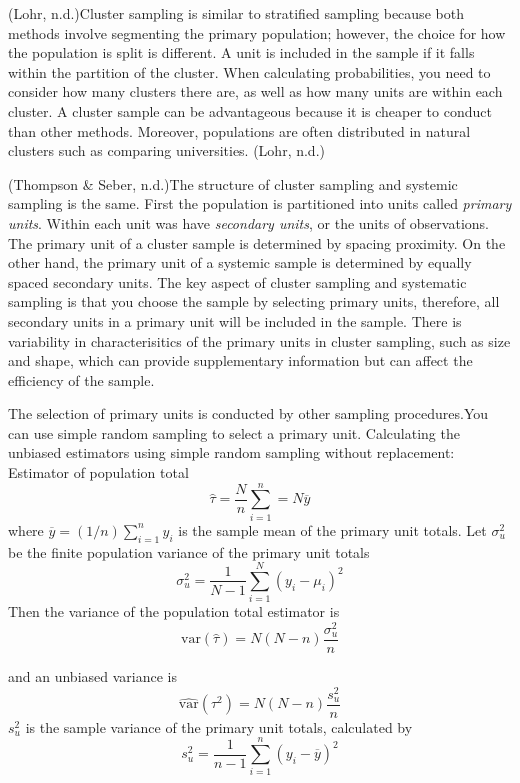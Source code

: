 \documentclass[12pt,twoside]{reedthesis}
\begin{document}
(Lohr, n.d.)Cluster sampling is similar to stratified sampling because both methods involve segmenting the primary population; however, the choice for how the population is split is different. A unit is included in the sample if it falls within the partition of the cluster. When calculating probabilities, you need to consider how many clusters there are, as well as how many units are within each cluster. A cluster sample can be advantageous because it is cheaper to conduct than other methods. Moreover, populations are often distributed in natural clusters such as comparing universities. (Lohr, n.d.)

(Thompson \& Seber, n.d.)The structure of cluster sampling and systemic sampling is the same. First the population is partitioned into units called \emph{primary units}. Within each unit was have \emph{secondary units}, or the units of observations. The primary unit of a cluster sample is determined by spacing proximity. On the other hand, the primary unit of a systemic sample is determined by equally spaced secondary units. The key aspect of cluster sampling and systematic sampling is that you choose the sample by selecting primary units, therefore, all secondary units in a primary unit will be included in the sample. There is variability in characterisitics of the primary units in cluster sampling, such as size and shape, which can provide supplementary information but can affect the efficiency of the sample.

The selection of primary units is conducted by other sampling procedures.You can use simple random sampling to select a primary unit. Calculating the unbiased estimators using simple random sampling without replacement:
Estimator of population total
\[
\hat{\tau} = \frac{N}{n}\sum^n_{i=1} = N\overline{y}
\]
where \(\overline{y} = (1/n)\sum^n_{i=1}y_i\) is the sample mean of the primary unit totals. Let \(\sigma^2_u\) be the finite population variance of the primary unit totals
\[
\sigma^2_u = \frac{1}{N-1}\sum^N_{i=1}(y_i-\mu_i)^2
\]
Then the variance of the population total estimator is
\[
\text{var}\left(\hat{\tau}\right) = N\left(N-n\right)\frac{\sigma^2_u}{n}
\]

and an unbiased variance is
\[
\widehat{\text{var}}\left(\tau^2\right) = N\left(N-n\right)\frac{s^2_u}{n}
\]
\(s^2_u\) is the sample variance of the primary unit totals, calculated by
\[
s_u^2 = \frac{1}{n-1}\sum^n_{i=1}\left(y_i-\overline{y}\right)^2
\]
\end{document}
